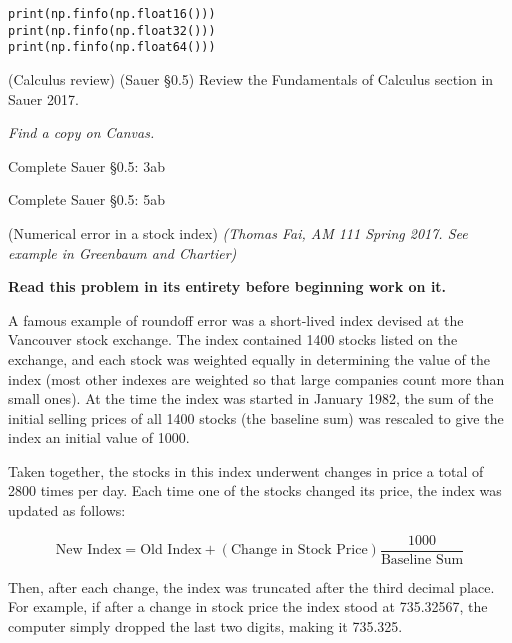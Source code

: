 \documentclass[12pt,letterpaper,noanswers]{exam}
\begin{document}
\begin{questions}
\begin{parts}
\begin{verbatim}
print(np.finfo(np.float16()))
print(np.finfo(np.float32()))
print(np.finfo(np.float64()))    
\end{verbatim}


\end{parts}

\question (Calculus review) (Sauer \S0.5) Review the Fundamentals of Calculus section in Sauer 2017. 

\emph{Find a copy on Canvas.} 
\begin{parts}
\item Complete Sauer \S0.5: 3ab
\item Complete Sauer \S0.5: 5ab
\end{parts}



\question (Numerical error in a stock index) \emph{(Thomas Fai, AM 111 Spring 2017.  See example in Greenbaum and Chartier) }

\textbf{Read this problem in its entirety before beginning work on it.}


A famous example of roundoff error was a short-lived index devised at the Vancouver stock exchange\cite{quinn1983}. The index contained 1400 stocks listed on the exchange, and each stock was weighted equally in determining the value of the index (most other indexes are weighted so that large companies count more than small ones). At the time the index was started in January 1982, the sum of the initial selling prices of all 1400 stocks (the baseline sum) was rescaled to give the index an initial value of 1000.

Taken together, the stocks in this index underwent changes in price a total of 2800 times per day. Each time one of the stocks changed its price, the index was updated as follows:

\[\text{New Index} = \text{Old Index} + (\text{Change in Stock Price})\dfrac{1000}{\text{Baseline Sum}}\]

Then, after each change, the index was truncated after the third decimal place. For example, if after a change in stock price the index stood at 735.32567, the computer simply dropped the last two digits, making it 735.325.
\end{questions}
\end{document}
